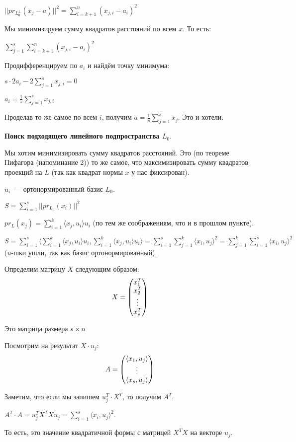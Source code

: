 $||pr_{L_0^{\perp}}(x_j-a)||^2 = \sum\limits_{i = k + 1}^n (x_{j, i} - a_i)^2$

Мы минимизируем сумму квадратов расстояний по всем $x$. То есть:

$\sum\limits_{j = 1}^s \sum\limits_{i = k + 1}^n (x_{j, i} - a_i)^2$

Продифференцируем по $a_i$ и найдём точку минимума:

$s\cdot 2a_i -2\sum\limits_{j=1}^s x_{j, i} = 0$

$a_i = \frac{1}{s} \sum\limits_{j=1}^s x_{j, i}$

Проделав то же самое по всем $i$, получим $a = \frac{1}{s} \sum\limits_{j=1}^s x_j$. Это и хотели.

{\bf Поиск подходящего линейного подпространства $L_0$}.

Мы хотим минимизировать сумму квадратов расстояний. Это (по теореме Пифагора (напоминание 2)) то же самое, что максимизировать сумму квадратов проекций на $L$ (так как квадрат нормы $x$ у нас фиксирован).

$u_i$~--- ортонормированный базис $L_0$.

$S = \sum\limits_{i = 1}^s ||pr_{L_0}(x_i)||^2$

$pr_L(x_j) = \sum\limits_{i = 1}^k \langle x_j, u_i\rangle u_i$ (по тем же соображениям, что и в прошлом пункте).

$S = \sum\limits_{i = 1}^s\langle\sum\limits_{i = 1}^k \langle x_j, u_i\rangle u_i, \sum\limits_{i = 1}^k \langle x_j, u_i\rangle u_i\rangle = \sum\limits_{i = 1}^s\sum\limits_{j = 1}^k \langle x_i, u_j\rangle^2 = \sum\limits_{j = 1}^k\sum\limits_{i = 1}^s \langle x_i, u_j\rangle^2$ ($u$-шки ушли, так как базис ортонормированный).

Определим матрицу $X$ следующим образом:
$$
X = \begin{pmatrix}
x_1^T\\
x_2^T\\
\vdots\\
x_s^T
\end{pmatrix}
$$

Это матрица размера $s\times n$

Посмотрим на результат $X\cdot u_j$:
$$
A=\begin{pmatrix}
\langle x_1, u_j\rangle\\
\vdots\\
\langle x_s, u_j\rangle
\end{pmatrix} 
$$

Заметим, что если мы запишем $u_j^T\cdot X^T$, то получим $A^T$.

$A^T\cdot A = u_j^TX^TXu_j = \sum\limits_{i = 1}^s\langle x_i, u_j\rangle^2$.

То есть, это значение квадратичной формы с матрицей $X^TX$ на векторе $u_j$.

